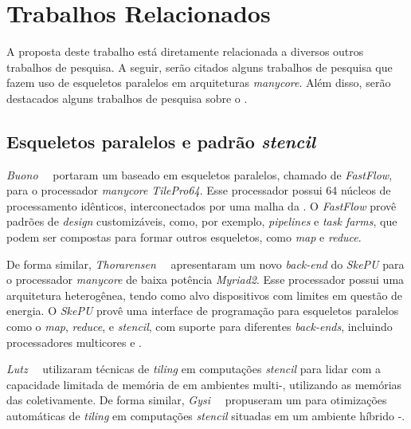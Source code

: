 \section{Trabalhos Relacionados}

A proposta deste trabalho está diretamente relacionada a diversos outros trabalhos de pesquisa.
A seguir, serão citados alguns trabalhos de pesquisa que fazem uso de esqueletos paralelos em
arquiteturas \textit{manycore}. Além disso, serão destacados alguns trabalhos de pesquisa sobre
o \mppa.


\subsection{Esqueletos paralelos e padrão \textit{stencil}}
\emph{Buono}~\etal~\cite{buono13} portaram um \fw baseado em esqueletos paralelos,
chamado de \emph{FastFlow}, para o processador \textit{manycore} \emph{TilePro64}.
Esse processador possui 64 núcleos de processamento idênticos, interconectados
por uma malha da \noc. O \fw \emph{FastFlow} provê padrões de \textit{design}
customizáveis, como, por exemplo, \textit{pipelines} e \textit{task farms},
que podem ser compostas para formar outros esqueletos, como \textit{map} e
\textit{reduce}.

De forma similar, \emph{Thorarensen}~\etal~\cite{thoraransen16} apresentaram um
novo \textit{back-end} do \fw \emph{SkePU} para o processador \textit{manycore}
de baixa potência \emph{Myriad2}. Esse processador possui uma arquitetura
heterogênea, tendo como alvo dispositivos com limites em questão de energia.
O \fw \emph{SkePU} provê uma interface de programação para esqueletos paralelos
como o \textit{map}, \textit{reduce}, e \textit{stencil}, com suporte para
diferentes \textit{back-ends}, incluindo processadores multicores e \gpus.

\emph{Lutz}~\etal~\cite{lutz13} utilizaram técnicas de \textit{tiling} em
computações \textit{stencil} para lidar com a capacidade limitada de memória
de \gpus em ambientes multi-\gpu, utilizando as memórias das \gpus
coletivamente. De forma similar, \emph{Gysi}~\etal~\cite{gysi15} propuseram um \fw
para otimizações automáticas de \textit{tiling} em computações \textit{stencil}
situadas em um ambiente híbrido \cpu{}-\gpu.

